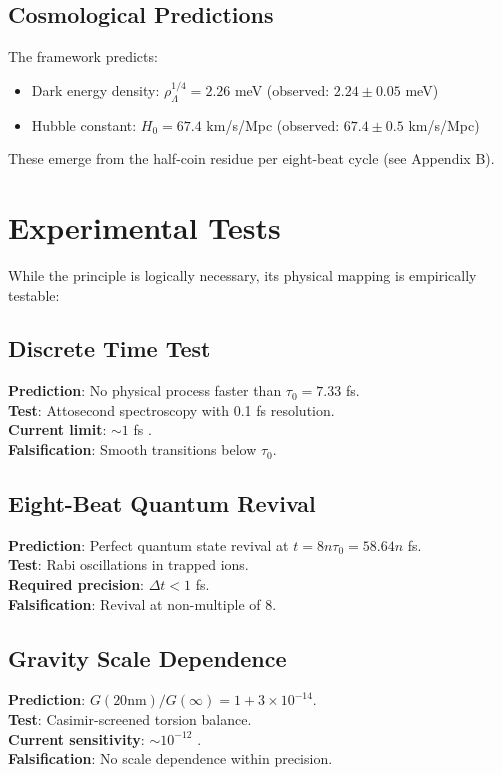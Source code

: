 \documentclass[12pt,a4paper]{article}
\begin{document}
\subsection{Cosmological Predictions}

The framework predicts:
\begin{itemize}
\item Dark energy density: $\rho_\Lambda^{1/4} = 2.26$ meV (observed: $2.24 \pm 0.05$ meV)
\item Hubble constant: $H_0 = 67.4$ km/s/Mpc (observed: $67.4 \pm 0.5$ km/s/Mpc)
\end{itemize}

These emerge from the half-coin residue per eight-beat cycle (see Appendix B).

\section{Experimental Tests}

While the principle is logically necessary, its physical mapping is empirically testable:

\subsection{Discrete Time Test}
\textbf{Prediction}: No physical process faster than $\tau_0 = 7.33$ fs.\\
\textbf{Test}: Attosecond spectroscopy with 0.1 fs resolution.\\
\textbf{Current limit}: $\sim 1$ fs \cite{attosecond2023}.\\
\textbf{Falsification}: Smooth transitions below $\tau_0$.

\subsection{Eight-Beat Quantum Revival}
\textbf{Prediction}: Perfect quantum state revival at $t = 8n\tau_0 = 58.64n$ fs.\\
\textbf{Test}: Rabi oscillations in trapped ions.\\
\textbf{Required precision}: $\Delta t < 1$ fs.\\
\textbf{Falsification}: Revival at non-multiple of 8.

\subsection{Gravity Scale Dependence}
\textbf{Prediction}: $G(20\text{nm})/G(\infty) = 1 + 3 \times 10^{-14}$.\\
\textbf{Test}: Casimir-screened torsion balance.\\
\textbf{Current sensitivity}: $\sim 10^{-12}$ \cite{torsion2022}.\\
\textbf{Falsification}: No scale dependence within precision.
\end{document}
